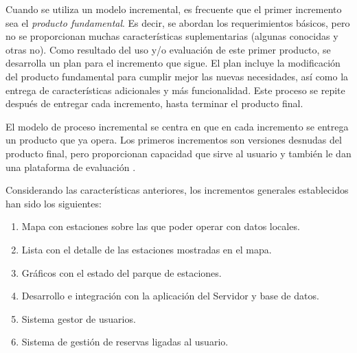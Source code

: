 Cuando se utiliza un modelo incremental, es frecuente que el primer incremento sea el \emph{producto fundamental}. Es decir, se abordan los requerimientos básicos, pero no se proporcionan muchas características suplementarias (algunas conocidas y otras no). Como resultado del uso y/o evaluación de este primer producto, se desarrolla un plan para el incremento que sigue. El plan incluye la modificación del producto fundamental para cumplir mejor las nuevas necesidades, así como la entrega de características adicionales y más funcionalidad. Este proceso se repite después de entregar cada incremento, hasta terminar el producto final.

El modelo de proceso incremental se centra en que en cada incremento se entrega un producto que ya opera. Los primeros incrementos son versiones desnudas del producto final, pero proporcionan capacidad que sirve al usuario y también le dan una plataforma de evaluación \cite{Pre10}.

Considerando las características anteriores, los incrementos generales establecidos han sido los siguientes:

\begin{enumerate}  
	\item Mapa con estaciones sobre las que poder operar con datos locales.
	\item Lista con el detalle de las estaciones mostradas en el mapa.
	\item Gráficos con el estado del parque de estaciones.
	\item Desarrollo e integración con la aplicación del Servidor y base de datos.
	\item Sistema gestor de usuarios.
	\item Sistema de gestión de reservas ligadas al usuario.
\end{enumerate}


